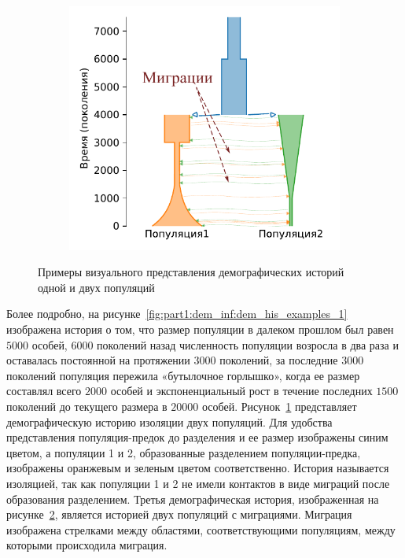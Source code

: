 \begin{figure}[ht]
\begin{subfigure}[b]{.33\textwidth}
    \caption{}
    \label{fig:part1:dem_inf:dem_his_examples_2}
    \end{subfigure}%
    \begin{subfigure}[b]{.33\textwidth}
    \includegraphics[width=\textwidth]{images/part1/dem_history/2d_model_migration_fixed.pdf}
    \caption{}
    \label{fig:part1:dem_inf:dem_his_examples_3}
    \end{subfigure}
    \caption{Примеры визуального представления демографических историй одной и двух популяций}
    \label{fig:part1:dem_inf:dem_his_examples}
\end{figure}

Более подробно, на рисунке~\ref{fig:part1:dem_inf:dem_his_examples_1} изображена история о том, что размер популяции в далеком прошлом был равен $5000$ особей, $6000$ поколений назад численность популяции возросла в два раза и оставалась постоянной на протяжении $3000$ поколений, за последние $3000$ поколений популяция пережила «бутылочное горлышко», когда ее размер составлял всего $2000$ особей и экспоненциальный рост в течение последних $1500$ поколений до текущего размера в $20000$ особей.
Рисунок~\ref{fig:part1:dem_inf:dem_his_examples_2} представляет демографическую историю изоляции двух популяций.
Для удобства представления популяция-предок до разделения и ее размер изображены синим цветом, а популяции 1 и 2, образованные разделением популяции-предка, изображены оранжевым и зеленым цветом соответственно.
История называется изоляцией, так как популяции 1 и 2 не имели контактов в виде миграций после образования разделением.
Третья демографическая история, изображенная на рисунке~\ref{fig:part1:dem_inf:dem_his_examples_3}, является историей двух популяций с миграциями.
Миграция изображена стрелками между областями, соответствующими популяциям, между которыми происходила миграция.

